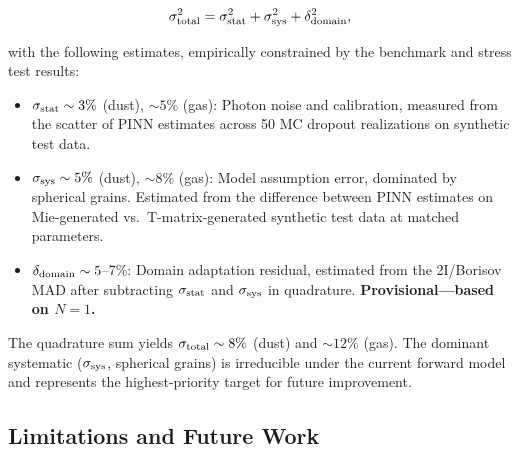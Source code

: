 \documentclass[preprint2]{aastex631}
\begin{document}
\begin{equation}
\sigma_{\rm total}^2 = \sigma_{\rm stat}^2 + \sigma_{\rm sys}^2 + \delta_{\rm domain}^2,
\end{equation}

with the following estimates, empirically constrained by the benchmark and stress test results:

\begin{itemize}
    \item $\sigma_{\rm stat} \sim 3\%$ (dust), $\sim 5\%$ (gas): Photon noise and calibration, measured from the scatter of PINN estimates across 50 MC dropout realizations on synthetic test data.
    \item $\sigma_{\rm sys} \sim 5\%$ (dust), $\sim 8\%$ (gas): Model assumption error, dominated by spherical grains. Estimated from the difference between PINN estimates on Mie-generated vs.\ T-matrix-generated synthetic test data at matched parameters.
    \item $\delta_{\rm domain} \sim 5$--7\%: Domain adaptation residual, estimated from the 2I/Borisov MAD after subtracting $\sigma_{\rm stat}$ and $\sigma_{\rm sys}$ in quadrature. \textbf{Provisional---based on $N=1$.}
\end{itemize}

The quadrature sum yields $\sigma_{\rm total} \sim 8\%$ (dust) and $\sim 12\%$ (gas). The dominant systematic ($\sigma_{\rm sys}$, spherical grains) is irreducible under the current forward model and represents the highest-priority target for future improvement.

\subsection{Limitations and Future Work}
\end{document}
